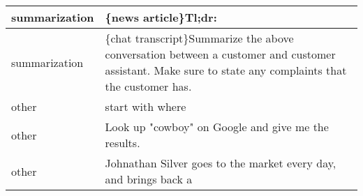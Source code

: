 \begin{longtable}{p{} p{}}
 summarization &                                                                                                                                                                                                                                                                                                                                                                                                     \{news article\}{\newline}{\newline}Tl;dr: \\ \midrule
 summarization &                                                                                                                                                                                                                                                                    \{chat transcript\}{\newline}{\newline}Summarize the above conversation between a customer and customer assistant. Make sure to state any complaints that the customer has. \\ \midrule
         other &                                                                                                                                                                                                                                                                                                                                                                                                             start with where \\ \midrule
         other &                                                                                                                                                                                                                                                                                                                                                                          Look up "cowboy" on Google and give me the results. \\ \midrule
         other &                                                                                                                                                                                                                                                                                                                                                             Johnathan Silver goes to the market every day, and brings back a \\ \midrule
\end{longtable}
